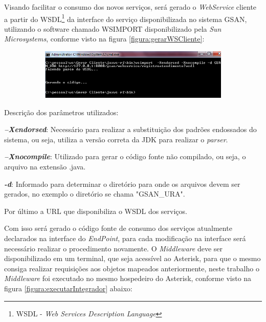 Visando facilitar o consumo dos novos serviços, será gerado o \textit{WebService} cliente a partir do WSDL\footnote{WSDL - \textit{Web Services Description Language}} da interface do serviço disponibilizada no sistema GSAN, utilizando o software chamado WSIMPORT disponibilizado pela \textit{Sun Microsystems}, conforme visto na figura \ref{figura:gerarWSCliente}:

\begin{figure}[H]
	\centering
	\caption{\textbf{Geração do código fonte para consumo do WebService.}}	
	\label{figura:gerarWSCliente}
	\begin{subfigure}[H]{\textwidth}
		\centering
		\includegraphics{figuras/gerar_wscliente.png}
	\end{subfigure}
\end{figure}

Descrição dos parâmetros utilizados:

\begin{description}
	\item \textbf{\textit{–Xendorsed}}: Necessário para realizar a substituição dos padrões endossados do sistema, ou seja, utiliza a versão correta da JDK para realizar o \textit{parser}.
	\item \textbf{\textit{–Xnocompile}}: Utilizado para gerar o código fonte não compilado, ou seja, o arquivo na extensão .java.
	\item \textbf{\textit{-d}}: Informado para determinar o diretório para onde os arquivos devem ser gerados, no exemplo o diretório se chama "GSAN\_URA".
	\item Por último a URL que disponibiliza o WSDL dos serviços. 
\end{description}



Com isso será gerado o código fonte de consumo dos serviços atualmente declarados na interface do \textit{EndPoint}, para cada modificação na interface será necessário realizar o procedimento novamente. O \textit{Middleware} deve ser disponibilizado em um terminal, que seja acessível ao Asterisk, para que o mesmo consiga realizar requisições aos objetos mapeados anteriormente, neste trabalho o \textit{Middleware} foi executado no mesmo hospedeiro do Asterisk, conforme visto na figura \ref{figura:executarIntegrador} abaixo:

